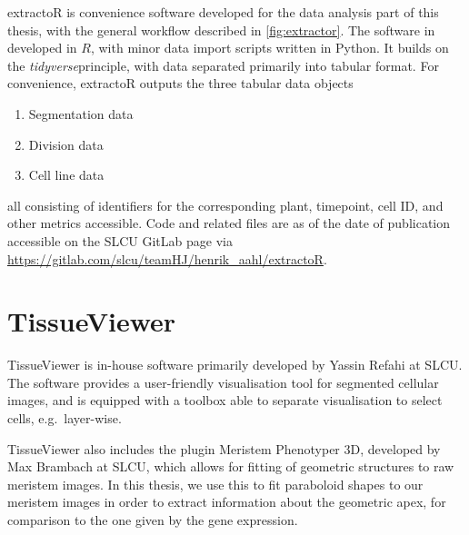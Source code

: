 extractoR is convenience software developed for the data analysis part of this
thesis, with the general workflow described in \cref{fig:extractor}. The
software in developed in $R$, with minor data import scripts written in Python.
It builds on the \textit{tidyverse}\CITE principle, with data separated
primarily into tabular format. For convenience, extractoR outputs the three
tabular data objects  
\begin{enumerate}
  \item Segmentation data
  \item Division data
  \item Cell line data
\end{enumerate}
all consisting of identifiers for the corresponding plant, timepoint, cell ID,
and other metrics accessible. Code and related files are as of the date of
publication accessible on the SLCU GitLab page via 
\url{https://gitlab.com/slcu/teamHJ/henrik_aahl/extractoR}.


\section{TissueViewer}
TissueViewer is in-house software primarily developed by Yassin Refahi at SLCU. The
software provides a user-friendly visualisation tool for segmented cellular
images, and is equipped with a toolbox able to separate visualisation to select
cells, e.g.\ layer-wise. 

TissueViewer also includes the plugin Meristem Phenotyper 3D, developed by Max
Brambach at SLCU, which allows for fitting of geometric structures to raw
meristem images. In this thesis, we use this to fit paraboloid shapes to our
meristem images in order to extract information about the geometric apex, for
comparison to the one given by the gene expression.
